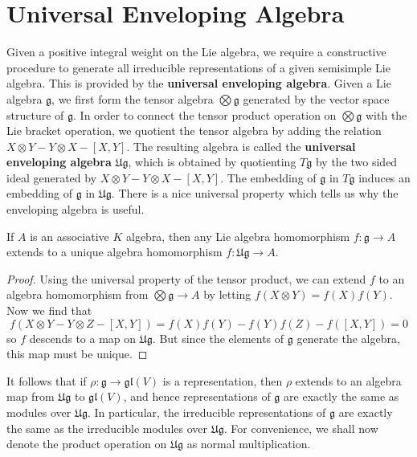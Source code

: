\section{Universal Enveloping Algebra}

Given a positive integral weight on the Lie algebra, we require a constructive procedure to generate all irreducible representations of a given semisimple Lie algebra. This is provided by the {\bf universal enveloping algebra}. Given a Lie algebra $\mathfrak{g}$, we first form the tensor algebra $\bigotimes \mathfrak{g}$ generated by the vector space structure of $\mathfrak{g}$. In order to connect the tensor product operation on $\bigotimes\mathfrak{g}$ with the Lie bracket operation, we quotient the tensor algebra by adding the relation $X \otimes Y - Y \otimes X - [X,Y]$. The resulting algebra is called the {\bf universal enveloping algebra} $\mathfrak{U g}$, which is obtained by quotienting $T\mathfrak{g}$ by the two sided ideal generated by $X \otimes Y - Y \otimes X - [X,Y]$. The embedding of $\mathfrak{g}$ in $T\mathfrak{g}$ induces an embedding of $\mathfrak{g}$ in $\mathfrak{U g}$. There is a nice universal property which tells us why the enveloping algebra is useful.

\begin{theorem}
    If $A$ is an associative $K$ algebra, then any Lie algebra homomorphism $f: \mathfrak{g} \to A$ extends to a unique algebra homomorphism $f: \mathfrak{Ug} \to A$.
\end{theorem}
\begin{proof}
    Using the universal property of the tensor product, we can extend $f$ to an algebra homomorphism from $\bigotimes \mathfrak{g} \to A$ by letting $f(X \otimes Y) = f(X)f(Y)$. Now we find that
    \[ f(X \otimes Y - Y \otimes Z - [X,Y]) = f(X)f(Y) - f(Y)f(Z) - f([X,Y]) = 0 \]
    so $f$ descends to a map on $\mathfrak{Ug}$. But since the elements of $\mathfrak{g}$ generate the algebra, this map must be unique.
\end{proof}

It follows that if $\rho: \mathfrak{g} \to \mathfrak{gl}(V)$ is a representation, then $\rho$ extends to an algebra map from $\mathfrak{Ug}$ to $\mathfrak{gl}(V)$, and hence representations of $\mathfrak{g}$ are exactly the same as modules over $\mathfrak{Ug}$. In particular, the irreducible representations of $\mathfrak{g}$ are exactly the same as the irreducible modules over $\mathfrak{Ug}$. For convenience, we shall now denote the product operation on $\mathfrak{Ug}$ as normal multiplication.

